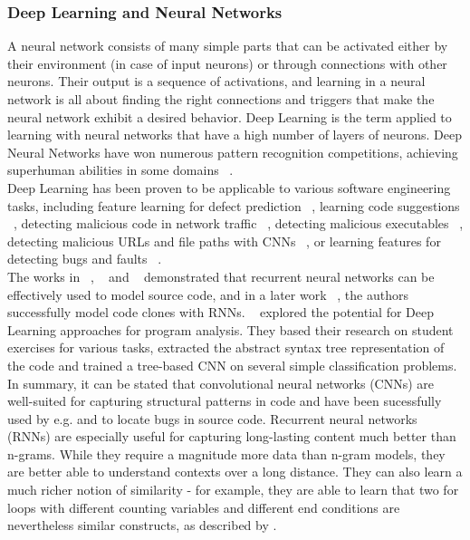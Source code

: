 \documentclass[
	a4paper,
	pagesize,
	pdftex,
	12pt,
	twoside, %
	BCOR=5mm, %
	ngerman,
	fleqn,
	final,
	]{scrartcl}
\begin{document}
\subsubsection{Deep Learning and Neural Networks}\label{Deep-Learning}
A neural network consists of many simple parts that can be activated either by their environment (in case of input neurons) or through connections with other neurons. Their output is a sequence of activations, and learning in a neural network is all about finding the right connections and triggers that make the neural network exhibit a desired behavior. Deep Learning is the term applied to learning with neural networks that have a high number of layers of neurons. Deep Neural Networks have won numerous pattern recognition competitions, achieving superhuman abilities in some domains ~\cite{Schmidhuber.2015}.\\
Deep Learning has been proven to be applicable to various software engineering tasks, including feature learning for defect prediction ~\cite{Wang.2016}, learning code suggestions ~\cite{Bhoopchand.2016}, detecting malicious code in network traffic ~\cite{Elovici.2007}, detecting malicious executables ~\cite{Schultz.2000}, detecting malicious URLs and file paths with CNNs ~\cite{Saxe.2017}, or learning features for detecting bugs and faults ~\cite{Huo.2016,Gupta.2017b}. \\
The works in ~\cite{White.2015}, ~\cite{Dam.2016b} and ~\cite{Dam.2016} demonstrated that recurrent neural networks can be effectively used to model source code, and in a later work ~\cite{White.2016}, the authors successfully model code clones with RNNs. ~\cite{Mou.2014} explored the potential for Deep Learning approaches for program analysis. They based their research on student exercises for various tasks, extracted the abstract syntax tree representation of the code and trained a tree-based CNN on several simple classification problems.\\
In summary, it can be stated that convolutional neural networks (CNNs) are well-suited for capturing structural patterns in code \cite{Dam.2016} and have been sucessfully used by e.g. \cite{Huo.2016} and \cite{Russell.2018} to locate bugs in source code. Recurrent neural networks (RNNs) are especially useful for capturing long-lasting content much better than n-grams. While they require a magnitude more data than n-gram models, they are better able to understand contexts over a long distance. They can also learn a much richer notion of similarity - for example, they are able to learn that two for loops with different counting variables and different end conditions are nevertheless similar constructs, as described by \cite{Allamanis.2018}. 
\end{document}
